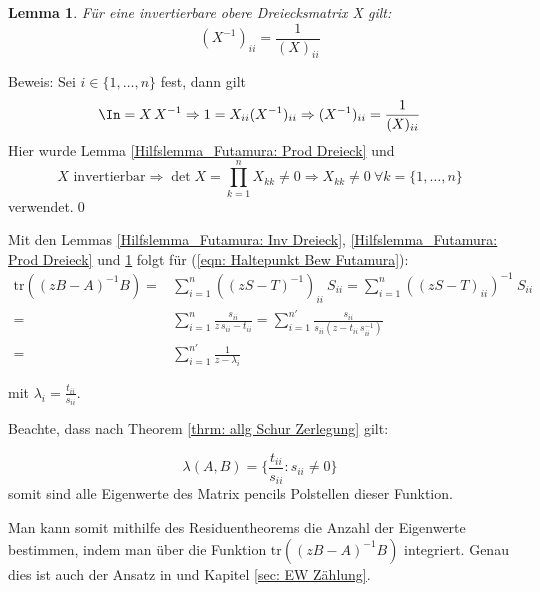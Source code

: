 \documentclass[a4paper,12pt]{report}
\newcommand{\tr}{\text{tr}}
\newcommand{\inv}{^{-1}}
\newcommand{\1}{\mathds{1}}
\theoremstyle{plain} %
\newtheorem{lemma}[theorem]{Lemma}  %
\theoremstyle{definition} %
\theoremstyle{remark}
\begin{document}
            \begin{lemma}
                  \label{Hilfslemma_Futamura: Diag Inv Dreieck}
                  Für eine invertierbare obere Dreiecksmatrix X gilt:
                  $$(X\inv)_{ii} = \frac 1 {(X)_{ii}}$$
            \end{lemma}
            Beweis: Sei $i\in\{1,\dots,n\}$ fest, dann gilt
            $$\In = X\,X\inv \Rightarrow 1 = X_{ii}(X\inv)_{ii} \Rightarrow (X\inv)_{ii} = \frac 1 {(X)_{ii}}$$
            Hier wurde Lemma \ref{Hilfslemma_Futamura: Prod Dreieck} und
            $$X \text{ invertierbar}\Rightarrow \det X = \prod_{k=1}^{n}X_{kk}\ne 0\Rightarrow X_{kk}\ne 0\ \forall k=\{1,\dots,n\}$$
            verwendet.\qed

            Mit den Lemmas \ref{Hilfslemma_Futamura: Inv Dreieck}, \ref{Hilfslemma_Futamura: Prod Dreieck} und \ref{Hilfslemma_Futamura: Diag Inv Dreieck} folgt für (\ref{eqn: Haltepunkt Bew Futamura}):
            \begin{align*}
                  \tr((zB-A)\inv B) =& \sum_{i=1}^{n}((zS-T)\inv)_{ii}\ S_{ii} = \sum_{i=1}^{n}((zS-T)_{ii})\inv\ S_{ii}\\
                  =& \sum_{i=1}^{n}\frac{s_{ii}}{z\,s_{ii}-t_{ii}} = \sum_{i=1}^{n'}\frac{s_{ii}}{s_{ii}(z-t_{ii}\, s_{ii}\inv)}\\
                  =& \sum_{i=1}^{n'} \frac{1}{z-\lambda_i}
            \end{align*}

            mit $\lambda_i = \frac{t_{ii}}{s_{ii}}$.


            Beachte, dass nach Theorem \ref{thrm: allg Schur Zerlegung} gilt:

            $$\lambda(A, B) = \{\frac{t_{ii}}{s_{ii}} : s_{ii}\ne 0\}$$
            somit sind alle Eigenwerte des Matrix pencils Polstellen dieser Funktion.

            Man kann somit mithilfe des Residuentheorems die Anzahl der Eigenwerte bestimmen, indem man über die Funktion $\tr((zB-A)\inv B)$ integriert.
            Genau dies ist auch der Ansatz in \cite{grundlageFutamura,hauptteilTkachuk} und Kapitel \ref{sec: EW Zählung}.

            
\end{document}
